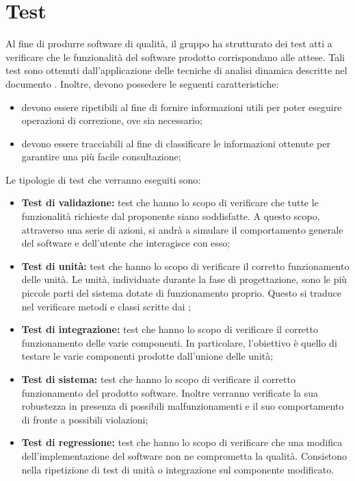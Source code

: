 \documentclass[PianoDiQualifica.tex]{subfiles}
\begin{document}
\section{Test}
Al fine di produrre software di qualità, il gruppo ha strutturato dei test atti a verificare che le funzionalità del software prodotto corrispondano alle attese.
Tali test sono ottenuti dall'applicazione delle tecniche di analisi dinamica descritte nel documento \NPdocRP{}. Inoltre, devono possedere le seguenti caratteristiche:
\begin{itemize}
	\item devono essere ripetibili al fine di fornire informazioni utili per poter eseguire operazioni di correzione, ove sia necessario;
	\item devono essere tracciabili al fine di classificare le informazioni ottenute per garantire una più facile consultazione;
\end{itemize}
Le tipologie di test che verranno eseguiti sono:
\begin{itemize}
\item \textbf{Test di validazione:} test che hanno lo scopo di verificare che tutte le funzionalità richieste dal proponente siano soddisfatte. A questo scopo, attraverso una serie di
azioni, si andrà a simulare il comportamento generale del software e dell'utente che interagisce con esso;
\item \textbf{Test di unità: } test che  hanno lo scopo di verificare il corretto funzionamento delle unità. Le unità, individuate durante la fase di progettazione, sono le
		più piccole parti del sistema dotate di funzionamento proprio. Questo si traduce nel verificare metodi e classi scritte dai \PRP{};
\item \textbf{Test di integrazione: } test che hanno lo scopo di verificare il corretto funzionamento delle varie componenti. In particolare, l'obiettivo è quello di testare le varie componenti prodotte dall'unione delle unità;
\item \textbf{Test di sistema: }test che hanno lo scopo di verificare il corretto funzionamento del prodotto software. Inoltre verranno verificate la sua robustezza in presenza di
		possibili malfunzionamenti e il suo comportamento di fronte a possibili violazioni;
\item \textbf{Test di regressione: } test che hanno lo scopo di verificare che una modifica dell'implementazione del software non ne comprometta la qualità. Consistono nella ripetizione di test di unità o integrazione sul componente modificato.			
\end{itemize}
	
	
	
	
	
	
	
	
	
	
\end{document}

